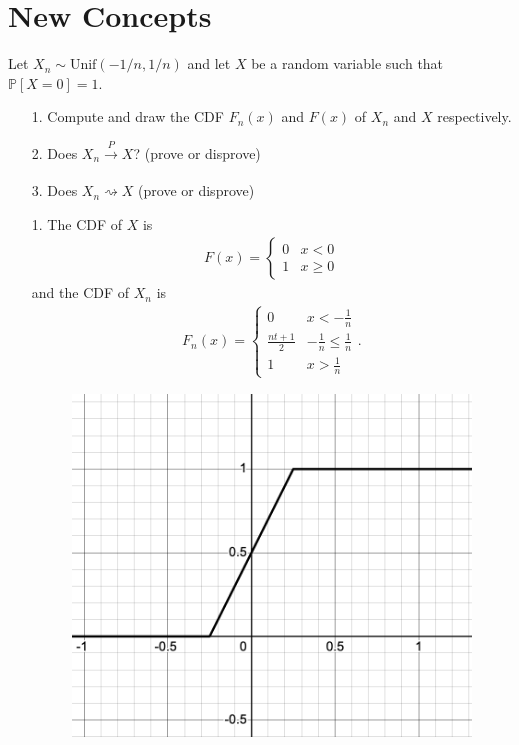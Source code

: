 \documentclass[a4paper]{article}
\begin{document}
\section{New Concepts}
\begin{Exercise}
	Let $X_n \sim \text{Unif}(-1/n, 1/n)$ and let $X$ be a random variable such that $\mathbb{P}[X = 0] = 1.$
	\begin{itemize}
		\item[1.] Compute and draw the CDF $F_n(x)$ and $F(x)$ of $X_n$ and $X$ respectively.
		\item[2.] Does $X_n \xrightarrow[]{P} X$? (prove or disprove)
		\item[3.] Does $X_n \rightsquigarrow X$ (prove or disprove)
	\end{itemize}
\end{Exercise}
\begin{Solution}
	\begin{itemize}
		\item[1.] The CDF of $X$ is \begin{align*} F(x) = 
				\begin{cases}
					0 & x < 0 \\ 
					1 & x \ge 0
				\end{cases}
			\end{align*}
			and the CDF of $X_n$ is
			\begin{align*}
				F_n(x) = \begin{cases}
					0 & x < -\frac{1}{n} \\
					\frac{nt + 1}{2} & -\frac{1}{n} \le \frac{1}{n} \\
					1 & x> \frac{1}{n}
				\end{cases}.
			\end{align*}
		\begin{figure}[t]
			\centering
			\includegraphics[scale=0.5]{f1}

\end{figure}
\end{itemize}
\end{Solution}
\end{document}
